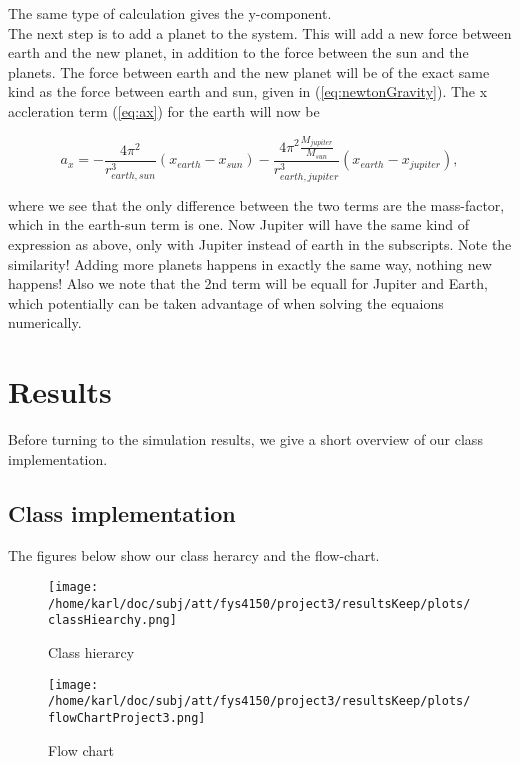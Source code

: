 \documentclass{article}
\begin{document}
The same type of calculation gives the y-component. \\

The next step is to add a planet to the system. This will add a new force between earth and the new planet, in addition to the force between the sun and the planets. The force between earth and the new planet will be of the exact same kind as the force between earth and sun, given in (\ref{eq:newtonGravity}). The x accleration term (\ref{eq:ax}) for the earth will now be

\begin{equation}\label{eq:3rdPlanet}
a_x = -\frac{4 \pi^2}{r_{earth,sun}^3} (x_{earth}-x_{sun}) - \frac{4 \pi^2 \frac{M_{jupiter}}{M_{sun}}}{r_{earth,jupiter}^3}(x_{earth}-x_{jupiter}),
\end{equation}

where we see that the only difference between the two terms are the mass-factor, which in the earth-sun term is one. Now Jupiter will have the same kind of expression as above, only with Jupiter instead of earth in the subscripts. Note the similarity! Adding more planets happens in exactly the same way, nothing new happens! Also we note that the 2nd term will be equall for Jupiter and Earth, which potentially can be taken advantage of when solving the equaions numerically. 


\section{Results}
Before turning to the simulation results, we give a short overview of our class implementation.

\subsection{Class implementation}
The figures below show our class herarcy and the flow-chart.

\begin{figure}[H]
		\centering
		\texttt{[image: /home/karl/doc/subj/att/fys4150/project3/resultsKeep/plots/classHiearchy.png]}
		\caption{Class hierarcy}
		\label{1}
\end{figure}

\begin{figure}[H]
		\centering
		\texttt{[image: /home/karl/doc/subj/att/fys4150/project3/resultsKeep/plots/flowChartProject3.png]}
		\caption{Flow chart}
		\label{1}
\end{figure}
\end{document}
